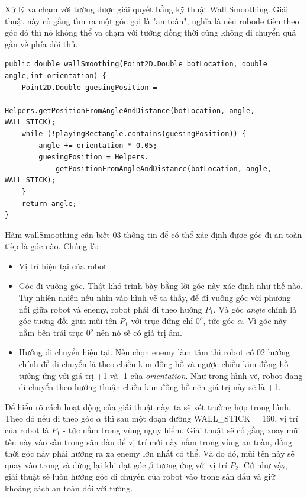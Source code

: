 \documentclass[14pt]{article}
\begin{document}
Xử lý va chạm với tường được giải quyết bằng kỹ thuật Wall Smoothing. Giải thuật này cố gắng tìm ra một góc gọi là "an toàn", nghĩa là nếu robode tiến theo góc đó thì nó không thể va chạm với tường đồng thời cũng không di chuyển quá gần về phía đối thủ.
\begin{lstlisting}[caption = wallSmoothing function, frame = single]
public double wallSmoothing(Point2D.Double botLocation, double angle,int orientation) {
	Point2D.Double guesingPosition = 
									Helpers.getPositionFromAngleAndDistance(botLocation, angle, WALL_STICK);
	while (!playingRectangle.contains(guesingPosition)) {
		angle += orientation * 0.05;
		guesingPosition = Helpers.
			getPositionFromAngleAndDistance(botLocation, angle, WALL_STICK);
	}
	return angle;
}
\end{lstlisting}
Hàm wallSmoothing cần biết 03 thông tin để có thể xác định được góc đi an toàn tiếp là góc nào. Chúng là:
	\begin{itemize}
		\item Vị trí hiện tại của robot
		\item Góc đi vuông góc. Thật khó trình bày bằng lời góc này xác định như thế nào. Tuy nhiên nhiên nếu nhìn vào hình vẽ ta thấy, để đi vuông góc với phương nối giữa robot và enemy, robot phải đi theo hướng $P_1$. Và góc \textit{angle} chính là góc tương đối giữa mũi tên $P_1$ với trục đứng chỉ $0^o$, tức góc $\alpha$. Vì góc này nằm bên trái trục $0^o$ nên nó sẽ có giá trị âm.
		\item Hướng di chuyển hiện tại. Nếu chọn enemy làm tâm thì robot có 02 hướng chính để di chuyển là theo chiều kim đồng hồ và ngược chiều kim đồng hồ tướng ứng với giá trị +1 và -1 của \textit{orientation}. Như trong hình vẽ, robot đang di chuyển theo hướng thuận chiều kim đồng hồ nên giá trị này sẽ là +1.
	\end{itemize}
Để hiểu rõ cách hoạt động của giải thuật này, ta sẽ xét trường hợp trong hình. Theo đó nếu đi theo góc $\alpha$ thì sau một đoạn đường WALL\_STICK = 160, vị trí của robot là $P_1$ - tức nằm trong vùng nguy hiểm. Giải thuật sẽ cố gắng xoay mũi tên này vào sâu trong sân đấu để vị trí mới này nằm trong vùng an toàn, đồng thời góc này phải hướng ra xa enemy lớn nhất có thể. Và do đó, mũi tên này sẽ quay vào trong và dừng lại khi đạt góc $\beta$ tương ứng với vị trí $P_2$. Cứ như vậy, giải thuật sẽ luôn hướng góc di chuyển của robot vào trong sân đấu và giữ khoảng cách an toàn đối với tường.
\end{document}
